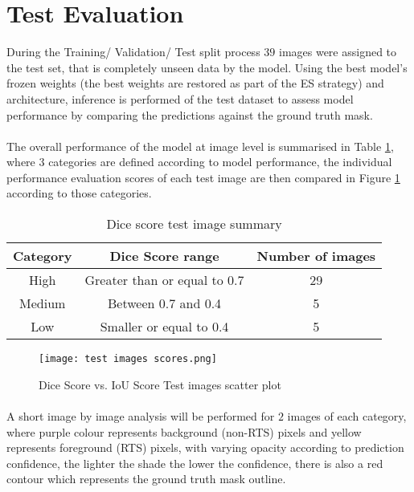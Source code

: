 \section{Test Evaluation}

During the Training/ Validation/ Test split process $39$ images were assigned to the test set, that is completely unseen data by the model. Using the best model's frozen weights (the best weights are restored as part of the \gls{ES} strategy) and architecture, inference is performed of the test dataset to assess model performance by comparing the predictions against the ground truth mask.

\paragraph{}
The overall performance of the model at image level is summarised in Table \ref{sum_test}, where $3$ categories are defined according to model performance, the individual performance evaluation scores of each test image are then compared in Figure \ref{scatter_test_scores} according to those categories.

    \begin{table}[ht!] 
        \begin{center}
        \begin{tabular}{ccc} 
        \toprule
        \textbf{Category} & \textbf{Dice Score range}  & \textbf{Number of images}  \\ \midrule
        High & Greater than or equal to 0.7 & 29  \\
        Medium & Between 0.7 and 0.4 & 5  \\
        Low & Smaller or equal to 0.4 & 5  \\
    \bottomrule
        \end{tabular}
      \end{center} 
      \caption{Dice score test image summary}\label{sum_test}
    \end{table}
    \begin{figure}[hbt!]
        \centering
        \texttt{[image: test images scores.png]}
        \caption{Dice Score vs. \gls{IoU} Score Test images scatter plot}
        \label{scatter_test_scores}
    \end{figure}
\paragraph{}
A short image by image analysis will be performed for $2$ images of each category, where purple colour represents background (non-\gls{RTS}) pixels and yellow represents foreground (\gls{RTS}) pixels, with varying opacity according to prediction confidence, the lighter the shade the lower the confidence, there is also a red contour which represents the ground truth mask outline.

